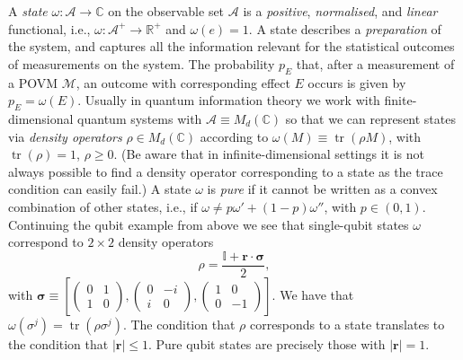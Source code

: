 \documentclass[11pt]{amsart}
\DeclareMathOperator{\tr}{tr}
\theoremstyle{plain}%
\theoremstyle{definition}
\theoremstyle{remark}
\begin{document}
A \emph{state} $\omega:\mathcal{A}\rightarrow \mathbb{C}$ on the observable set $\mathcal{A}$ is a \emph{positive}, \emph{normalised}, and \emph{linear} functional, i.e., $\omega:\mathcal{A}^+\rightarrow \mathbb{R}^+$ and $\omega(e) = 1$. A state describes a \emph{preparation} of the system, and captures all the information relevant for the statistical outcomes of measurements on the system. The probability $p_E$ that, after a measurement of a POVM $\mathcal{M}$, an outcome with corresponding effect $E$ occurs is given by $p_E = \omega(E)$. Usually in quantum information theory we work with finite-dimensional quantum systems with $\mathcal{A}\equiv M_d(\mathbb{C})$ so that we can represent states via \emph{density operators} $\rho\in M_d(\mathbb{C})$ according to $\omega(M) \equiv \tr(\rho M)$, with $\tr(\rho) = 1$, $\rho \ge 0$. (Be aware that in infinite-dimensional settings it is not always possible to find a density operator corresponding to a state as the trace condition can easily fail.) A state $\omega$ is \emph{pure} if it cannot be written as a convex combination of other states, i.e., if $\omega \not= p \omega' + (1-p) \omega''$, with $p\in (0,1)$. Continuing the qubit example from above we see that single-qubit states $\omega$ correspond to $2\times 2$ density operators 
\begin{equation}
	\rho = \frac{\mathbb{I} + \mathbf{r}\cdot \boldsymbol{\sigma}}{2},  
\end{equation}  
with $\boldsymbol{\sigma} \equiv \left[\left(\begin{smallmatrix} 0 & 1 \\ 1 & 0\end{smallmatrix}\right), \left(\begin{smallmatrix} 0 & -i \\ i & 0\end{smallmatrix}\right), \left(\begin{smallmatrix} 1 & 0 \\ 0 & -1\end{smallmatrix}\right)\right]$. We have that $\omega(\sigma^j) = \tr(\rho \sigma^j)$. The condition that $\rho$ corresponds to a state translates to the condition that $|\mathbf{r}| \le 1$. Pure qubit states are precisely those with $|\mathbf{r}| = 1$.
\end{document}
